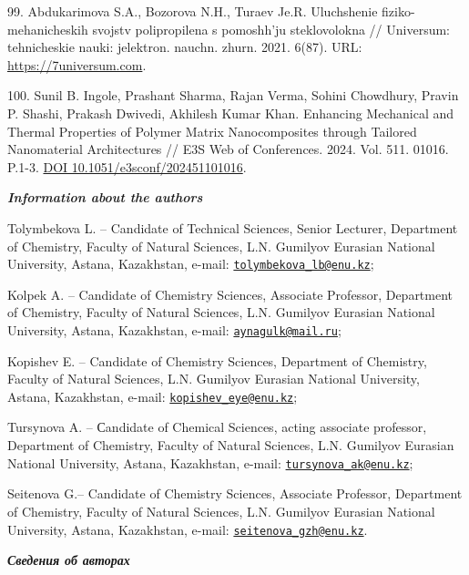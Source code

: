 \begin{references}
99. Abdukarimova S.A., Bozorova N.H., Turaev Je.R. Uluchshenie
fiziko-mehanicheskih svojstv poliprop\-ilena s pomoshh'ju steklovolokna
// Universum: tehnicheskie nauki:
jelektron. nauchn. zhurn. 2021. 6(87). URL: \href{https://7universum.com/ru/tech/archive/item/11948}{https://7universum.com}.

100. Sunil B. Ingole, Prashant Sharma, Rajan Verma, Sohini Chowdhury,
Pravin P. Shashi, Prakash Dwivedi, Akhilesh Kumar Khan. Enhancing
Mechanical and Thermal Properties of Polymer Matrix Nanocomposites
through Tailored Nanomaterial Architectures // E3S Web of
Conferences. 2024. Vol. 511. 01016. P.1-3. \href{https://doi.org/10.1051/e3sconf/202451101016}{DOI 10.1051/e3sconf/202451101016}.
\end{references}

\begin{authorinfo}
\hspace{1em}\emph{{\bfseries Information about the authors}}

Tolymbekova L. -- Candidate of Technical Sciences, Senior Lecturer,
Department of Chemistry, Faculty of Natural Sciences, L.N. Gumilyov
Eurasian National University, Astana, Kazakhstan, e-mail:
\href{mailto:tolymbekova\_lb@enu.kz}{\nolinkurl{tolymbekova\_lb@enu.kz}};

Kolpek A. -- Candidate of Chemistry Sciences, Associate Professor,
Department of Chemistry, Faculty of Natural Sciences, L.N. Gumilyov
Eurasian National University, Astana, Kazakhstan, e-mail:
\href{mailto:aynagulk@mail.ru}{\nolinkurl{aynagulk@mail.ru}};

Kopishev E. -- Candidate of Chemistry Sciences, Department of Chemistry,
Faculty of Natural Sciences, L.N. Gumilyov Eurasian National University,
Astana, Kazakhstan, e-mail:
\href{mailto:kopishev\_eye@enu.kz}{\nolinkurl{kopishev\_eye@enu.kz}};

Tursynova A. -- Сandidate of Chemical Sciences, acting associate
professor, Department of Chemistry, Faculty of Natural Sciences, L.N.
Gumilyov Eurasian National University, Astana, Kazakhstan, e-mail:
\href{mailto:tursynova\_ak@enu.kz}{\nolinkurl{tursynova\_ak@enu.kz}};

Seitenova G.-- Candidate of Chemistry Sciences, Associate Professor,
Department of Chemistry, Faculty of Natural Sciences, L.N. Gumilyov
Eurasian National University, Astana, Kazakhstan, e-mail:
\href{mailto:seitenova\_gzh@enu.kz}{\nolinkurl{seitenova\_gzh@enu.kz}}.

\hspace{1em}\emph{{\bfseries Сведения об авторах}}


\end{authorinfo}

